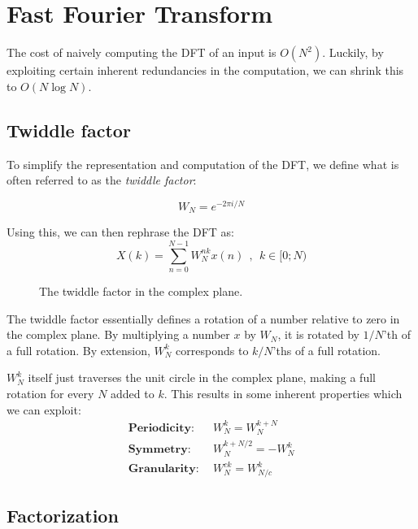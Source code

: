 \section{Fast Fourier Transform}

The cost of naively computing the DFT of an input is $O(N^2)$.
Luckily, by exploiting certain inherent redundancies in the computation,
we can shrink this to $O(N \log N)$.

\subsection{Twiddle factor}

To simplify the representation and computation of the DFT,
we define what is often referred to as the \textit{twiddle factor}:

\begin{equation}
    W_N = e^{-2 \pi i / N}
\end{equation}

Using this, we can then rephrase the DFT as:
\begin{equation}
    X(k) = \sum_{n = 0}^{N - 1} W_N^{nk} x(n)~~,~~k \in [0; N)
\end{equation}

\begin{figure}
    \centering
    \begin{tikzpicture}

    \end{tikzpicture}
    \caption{The twiddle factor in the complex plane.\label{fig:twid}}
\end{figure}

The twiddle factor essentially defines a rotation of a number relative to zero in the complex plane.
By multiplying a number $x$ by $W_N$, it is rotated by $1/N$'th of a full rotation.
By extension, $W_N^{k}$ corresponds to $k/N$'ths of a full rotation.

$W_N^k$ itself just traverses the unit circle in the complex plane,
making a full rotation for every $N$ added to $k$.
This results in some inherent properties which we can exploit:
\begin{align}
    \textbf{Periodicity:} &~~W^k_N = W^{k + N}_N\\
    \textbf{Symmetry:}    &~~W^{k + N/2}_N = -W^k_N\\
    \textbf{Granularity:} &~~W_N^{ck} = W_{N/c}^{k}
\end{align}

\subsection{Factorization}

